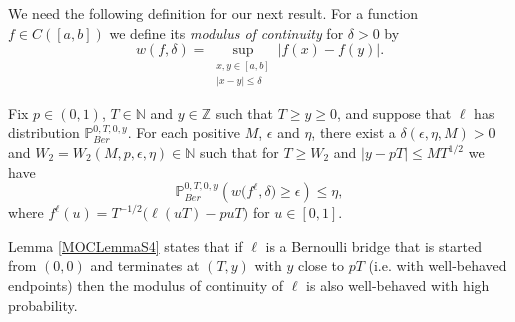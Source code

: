 We need the following definition for our next result. For a function $f \in C([a,b])$ we define its {\em modulus of continuity} for $\delta > 0$ by
\begin{equation}\label{MOCS4}
w(f,\delta) = \sup_{\substack{x,y \in [a,b]\\ |x-y| \leq \delta}} |f(x) - f(y)|.
\end{equation}
\begin{lemma}\label{MOCLemmaS4}Fix $p \in (0,1)$, $T \in \mathbb{N}$ and $y\in \mathbb{Z}$ such that $T \geq y \geq 0$, and suppose that $\ell$ has distribution $\mathbb{P}^{0,T,0,y}_{Ber}$. For each positive $M$, $\epsilon$ and $\eta$, there exist a $\delta(\epsilon, \eta, M) > 0$ and $W_2 = W_2(M, p, \epsilon, \eta) \in \mathbb{N}$ such that  for $T \geq W_2$ and $|y - pT| \leq MT^{1/2}$ we have
\begin{equation}\label{MOCeqS4}
\mathbb{P}^{0,T,0,y}_{Ber}\left( w\big({f^\ell},\delta\big) \geq \epsilon \right) \leq \eta,
\end{equation}
where $f^\ell(u) = T^{-1/2}\big(\ell(uT) - puT\big)$  for $u \in [0,1]$.
\end{lemma}
\begin{remark}
Lemma \ref{MOCLemmaS4} states that if $\ell$ is a Bernoulli bridge that is started from $(0,0)$ and terminates at $(T,y)$ with $y$ close to $pT$ (i.e. with well-behaved endpoints) then the modulus of continuity of $\ell$ is also well-behaved with high probability.
\end{remark}
